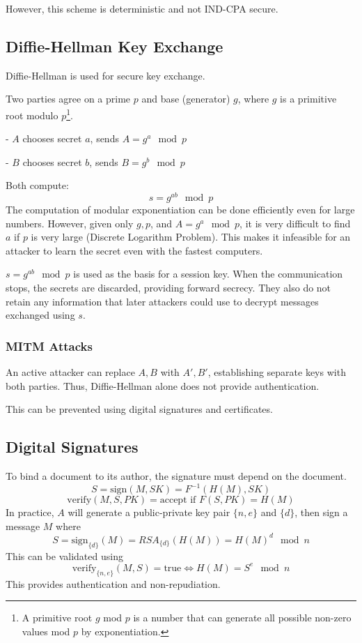 However, this scheme is deterministic and not IND-CPA secure.

\subsection{Diffie-Hellman Key Exchange}
Diffie-Hellman is used for secure key exchange.

Two parties agree on a prime \(p\) and base (generator) \(g\), where \(g\) is a primitive root modulo \(p\)\footnote{A primitive root \(g\) mod \(p\) is a number that can generate all possible non-zero values mod \(p\) by exponentiation.}.

- \(A\) chooses secret \(a\), sends \(A = g^a \mod p\)

- \(B\) chooses secret \(b\), sends \(B = g^b \mod p\)

Both compute:
\[
  s = g^{ab} \mod p
\]
The computation of modular exponentiation can be done efficiently even for large numbers. However, given only \(g, p\), and \(A = g^a \mod p\), it is very difficult to find \(a\) if \(p\) is very large (Discrete Logarithm Problem). This makes it infeasible for an attacker to learn the secret even with the fastest computers.

\(s = g^{ab} \mod p\) is used as the basis for a session key. When the communication stops, the secrets are discarded, providing forward secrecy. They also do not retain any information that later attackers could use to decrypt messages exchanged using \(s\).

\subsubsection{MITM Attacks}
An active attacker can replace \(A, B\) with \(A', B'\), establishing separate keys with both parties. Thus, Diffie-Hellman alone does not provide authentication.

This can be prevented using digital signatures and certificates.

\subsection{Digital Signatures}
To bind a document to its author, the signature must depend on the document.
\[
  S = \text{sign}(M, SK) = F^{-1}(H(M), SK)
\]
\[
  \text{verify}(M, S, PK) = \text{accept if } F(S, PK) = H(M)
\]
In practice, \(A\) will generate a public-private key pair \(\{n, e\}\) and \(\{d\}\), then sign a message \(M\) where 
\[
  S = \text{sign}_{\{d\}} (M) = RSA_{\{d\}} (H(M)) = H(M)^d \mod n
\]
This can be validated using 
\[
  \text{verify}_{\{n, e\}} (M, S) = \text{true} \iff H(M) = S^e \mod n
\]
This provides authentication and non-repudiation.

